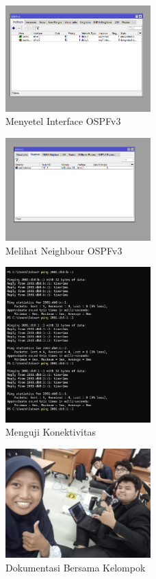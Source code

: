 \begin{figure}[H] 
    \centering
    \includegraphics[width=0.5\textwidth]{Dokum P2/Laptop 2/jarkomp2-dinamis-3.png} 
    \caption{Menyetel Interface OSPFv3} 
    \label{fig:langkahb3} 
\end{figure}
\begin{figure}[H] 
    \centering
    \includegraphics[width=0.5\textwidth]{Dokum P2/Laptop 2/jarkomp2-dinamis-4.png} 
    \caption{Melihat Neighbour OSPFv3} 
    \label{fig:langkahb4} 
\end{figure}
\begin{figure}[H] 
    \centering
    \includegraphics[width=0.5\textwidth]{Dokum P2/Laptop 2/jarkomp2-dinamis-5.png} 
    \caption{Menguji Konektivitas} 
    \label{fig:langkahb5} 
\end{figure}
\begin{figure}[H] 
    \centering
    \includegraphics[width=0.5\textwidth]{Dokum P2/Dokum kelompok.jpg} 
    \caption{Dokumentasi Bersama Kelompok} 
    \label{fig:dokum} 
\end{figure}